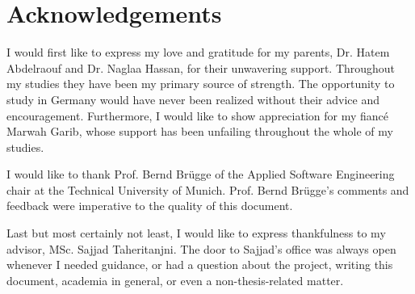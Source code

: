 \documentclass[a4paper,12pt,twoside]{report}
\begin{document}
\setlength{\evensidemargin}{22pt}
\setlength{\oddsidemargin}{22pt}

\def\doctype{Master's Thesis}
\def\faculty{Informatik}
\def\title{Using Synthetic Data for Classification of Small Parts}
\def\titleGer{Verwendung synthetischer Daten für die Kleinteil-Erkennung}
\def\supervisor{Prof. Bernd Brügge, Ph.D.}
\def\advisor{Sajjad Taheritanjni, M.Sc.}
\def\author{Amr Abdelraouf}
\def\date{15.10.2018}



\lstset{showspaces=false, numbers=left, frame=single, basicstyle=\small}




\newpage
\thispagestyle{empty}
\mbox{}


\newpage
\thispagestyle{empty}
\mbox{}

\chapter*{Acknowledgements}
I would first like to express my love and gratitude for my parents, Dr. Hatem Abdelraouf and Dr. Naglaa Hassan, for their unwavering support. Throughout my studies they have been my primary source of strength. The opportunity to study in Germany would have never been realized without their advice and encouragement. Furthermore, I would like to show appreciation for my fiancé Marwah Garib, whose support has been unfailing throughout the whole of my studies.

I would like to thank Prof. Bernd Brügge of the Applied Software Engineering chair at the Technical University of Munich. Prof. Bernd Brügge's comments and feedback were imperative to the quality of this document.

Last but most certainly not least, I would like to express thankfulness to my advisor, MSc. Sajjad Taheritanjni. The door to Sajjad's office was always open whenever I needed guidance, or had a question about the project, writing this document, academia in general, or even a non-thesis-related matter.




\clearpage

\tableofcontents
\clearpage
\end{document}
